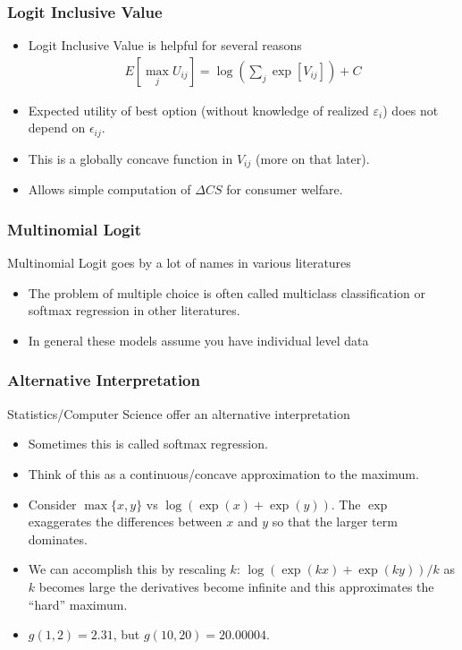 \documentclass[xcolor=pdftex,dvipsnames,table,mathserif]{beamer}
\begin{document}
\begin{frame}
\frametitle{Logit Inclusive Value}
\begin{itemize}
\item Logit Inclusive Value is helpful for several reasons
\begin{eqnarray*}
E[\max_j U_{ij}] = \log \left(\sum_j \exp[V_{ij}] \right) + C
\end{eqnarray*}
\item Expected utility of best option (without knowledge of realized $\varepsilon_i$) does not depend on $\epsilon_{ij}$.
\item This is a globally concave function in $V_{ij}$ (more on that later).
\item Allows simple computation of $\Delta CS$ for consumer welfare.
\end{itemize}
\end{frame}

\begin{frame}
\frametitle{Multinomial Logit}
Multinomial Logit goes by a lot of names in various literatures
\begin{itemize}
\item The problem of multiple choice is often called \alert{multiclass classification} or \alert{softmax regression} in other literatures.
\item In general these models assume you have individual level data
\end{itemize}
\end{frame}

\begin{frame}
\frametitle{Alternative Interpretation}
Statistics/Computer Science offer an alternative interpretation
\begin{itemize}
\item Sometimes this is called \alert{softmax} regression.
\item Think of this as a continuous/concave approximation to the maximum.
\item Consider $\max\{x,y\}$ vs $\log(\exp(x) + \exp(y))$. The $\exp$ exaggerates the differences between $x$ and $y$ so that the larger term dominates.
\item We can accomplish this by rescaling $k$:  $\log(\exp(kx) + \exp(ky))/k$ as $k$ becomes large the derivatives become infinite and this approximates the ``hard'' maximum.
\item $g(1, 2) = 2.31$, but $g(10, 20) = 20.00004$.
\end{itemize}
\end{frame}
\end{document}
